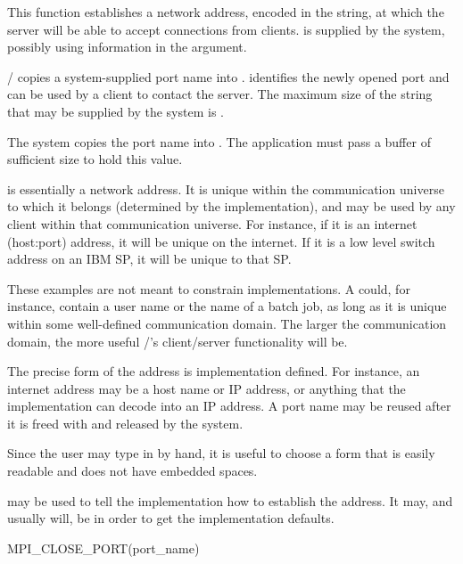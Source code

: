 This function establishes a network address, encoded in
the  string, at which
the server will be able to accept connections from clients.
 is supplied by the system, possibly
using information in the  argument.

\MPI/ copies a system-supplied port name into
. 
identifies the newly opened port and can be used by a client to contact the
server.  The maximum size of the string that may be supplied by the system is
.
\begin{users}
The system copies the port name into . The application
must pass a buffer of sufficient size to hold this value.
\end{users}

 is essentially a network address.
It is unique within the communication universe
to which it belongs (determined by the implementation),
and may be used by any client within that
communication universe.  For instance, if it is an internet
(host:port) address, it will be unique on the internet. If it is a low
level switch address on an IBM SP, it will be unique to that SP.
\begin{implementors}
These examples are not meant to constrain implementations.
A  could, for instance, contain a user name
or the name of a batch job, as long as  it is unique within
some well-defined communication domain. The larger the
communication domain, the more useful \MPI/'s client/server
functionality will be.
\end{implementors}
The precise form of the address is implementation defined. For
instance, an internet address may be a host name or IP address,
or anything that the implementation can decode into an IP address.
A port name may be reused after it is freed with
 and released by the system.

\begin{implementors}
Since the user may type in  by hand,
it is useful to choose a form that is easily readable
and does not have embedded spaces.
\end{implementors}


 may be used to tell the implementation
how to establish the address. It may, and usually will,
be  in order to get
the implementation defaults.

\begin{funcdef}{MPI\_CLOSE\_PORT}{(\mbox{port\_name})}
\end{funcdef}

